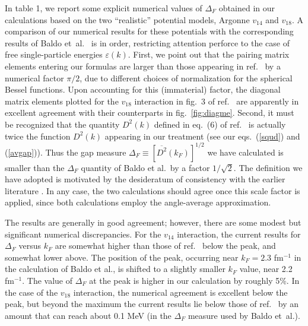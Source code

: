 In table 1, we report some explicit numerical values of $\Delta_F$
obtained in our calculations based on the two ``realistic'' potential 
models, Argonne $v_{14}$ and $v_{18}$.  A comparison of our numerical 
results for these potentials with the corresponding results of Baldo 
et~al.~\cite{catoslo} is in order, restricting attention perforce to 
the case of free single-particle energies $\varepsilon(k)$.   First, we 
point out that the pairing matrix elements entering our formulas are larger 
than those appearing in ref.~\cite{catoslo} by a numerical factor 
$\pi/2$, due to different choices of normalization for the spherical 
Bessel functions.  Upon accounting for this (immaterial) factor, the 
diagonal matrix elements plotted for the $v_{18}$ interaction in fig.~3 
of ref.~\cite{catoslo} are apparently in excellent agreement with 
their counterparts in fig.~\ref{fig:diagme}.  Second, it must be
recognized that the quantity $D^2(k)$ defined in eq.~(6) of 
ref.~\cite{catoslo} is actually twice the function $D^2(k)$
appearing in our treatment (see our eqs.~(\ref{squd}) and 
(\ref{avgap})).  Thus the gap measure $\Delta_F\equiv 
[{\overline{D^2}}(k_F)]^{1/2}$ we have calculated is
smaller than the $\Delta_F$ quantity of Baldo et al.\ by a factor 
$1/\sqrt{2}$.  The definition we have adopted is motivated
by the desideratum of consistency with the earlier literature 
\cite{ttr,ostgaard}.  In any case, the two calculations should 
agree once this scale factor is applied, since both calculations 
employ the angle-average approximation.

The results are generally in good agreement; however, there
are some modest but significant numerical discrepancies.
For the $v_{14}$ interaction, the current results for
$\Delta_F$ versus $k_F$ are somewhat higher than those of 
ref.~\cite{catoslo} below the peak, and somewhat lower above.  
The position of the peak, occurring near $k_F=2.3$ fm$^{-1}$ in 
the calculation of Baldo et al., is shifted to a slightly smaller 
$k_F$ value, near 2.2 fm$^{-1}$.  The value of $\Delta_F$ at the peak is 
higher in our calculation by roughly 5\%.  In the case of the 
$v_{18}$ interaction, the numerical agreement is excellent below 
the peak, but beyond the maximum the current results lie below those 
of ref.~\cite{catoslo} by an amount that can reach about 0.1 MeV 
(in the $\Delta_F$ measure used by Baldo et~al.).  

